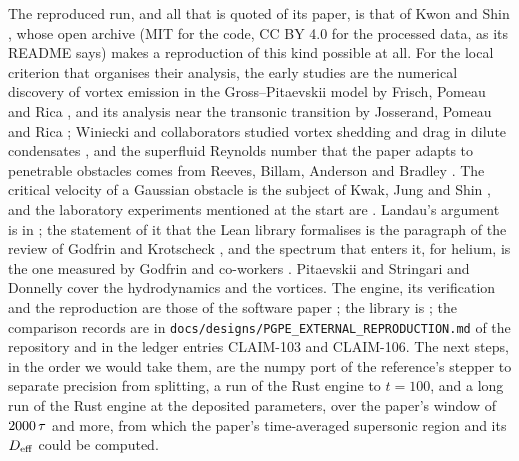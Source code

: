 The reproduced run, and all that is quoted of its paper, is that of Kwon and Shin \cite{KwonShin2026prr}, whose open archive \cite{KwonShin2026data} (MIT for the code, CC BY 4.0 for the processed data, as its README says) makes a reproduction of this kind possible at all. For the local criterion that organises their analysis, the early studies are the numerical discovery of vortex emission in the Gross--Pitaevskii model by Frisch, Pomeau and Rica \cite{FrischPomeauRica1992}, and its analysis near the transonic transition by Josserand, Pomeau and Rica \cite{JosserandPomeauRica1999}; Winiecki and collaborators studied vortex shedding and drag in dilute condensates \cite{Winiecki2000}, and the superfluid Reynolds number that the paper adapts to penetrable obstacles comes from Reeves, Billam, Anderson and Bradley \cite{Reeves2015}. The critical velocity of a Gaussian obstacle is the subject of Kwak, Jung and Shin \cite{Kwak2023}, and the laboratory experiments mentioned at the start are \cite{Raman1999,Kwon2015PRA,Kwon2016PRL}. Landau's argument is in \cite{Landau1941}; the statement of it that the Lean library formalises is the paragraph of the review of Godfrin and Krotscheck \cite{GodfrinKrotscheck2022}, and the spectrum that enters it, for helium, is the one measured by Godfrin and co-workers \cite{Godfrin2021}. Pitaevskii and Stringari \cite{PitaevskiiStringari2016} and Donnelly \cite{Donnelly1991} cover the hydrodynamics and the vortices. The engine, its verification and the reproduction are those of the software paper \cite{Callens2026sw}; the library is \cite{Callens2026lib}; the comparison records are in \texttt{docs/designs/PGPE\_EXTERNAL\_REPRODUCTION.md} of the repository and in the ledger entries CLAIM-103 and CLAIM-106. The next steps, in the order we would take them, are the numpy port of the reference's stepper to separate precision from splitting, a run of the Rust engine to $t=100$, and a long run of the Rust engine at the deposited parameters, over the paper's window of $2000\,\tau$ and more, from which the paper's time-averaged supersonic region and its $D_{\rm eff}$ could be computed.
